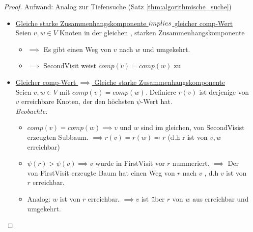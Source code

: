 \begin{proof}
	 Aufwand: Analog zur Tiefensuche (Satz \ref{thm:algorithmische_suche})
\begin{itemize}
	\item \underline{Gleiche starke Zusammenhangskomponente $\\implies $ gleicher comp-Wert} \\
Seien $v,w \in V$ Knoten in der gleichen , starken Zusammenhangskomponente \\
\begin{itemize}
	\item $\implies $ Es gibt einen Weg von $v$ nach $w$ und umgekehrt.
	\item $\implies $ SecondVisit weist $comp(v)=comp(w)$ zu
\end{itemize}
\item \underline{Gleicher comp-Wert $\implies $ Gleiche starke Zusammenhangskomponente} \\
Seien $v,w \in V$ mit $comp(v)=comp(w)$. Definiere $r(v)$ ist derjenige von $v$  erreichbare Knoten, der den höchsten $\psi$-Wert hat. \\
\emph{Beobachte:}
\begin{itemize}
	\item $comp(v)=comp(w) \implies v \text{ und } w$  sind im gleichen, von SecondVisist erzeugten Subbaum.
	$\implies r(v)=r(w) \eqqcolon r$ (d.h r ist von $v,w$ erreichbar)
\item $\psi(r)>\psi(v) \implies v$ wurde in FirstVisit vor $r$ nummeriert. $\implies $ Der von FirstVisit erzeugte Baum hat einen Weg von $r$ nach $v$ , d.h $v$ ist von $r$ erreichbar.
\item Analog: $w$ ist von $r$ erreichbar. $\implies v$ ist über $r$ von $w$  aus erreichbar und umgekehrt. 
\end{itemize}
\end{itemize}
\end{proof}
\begin{definition}

\end{definition}
